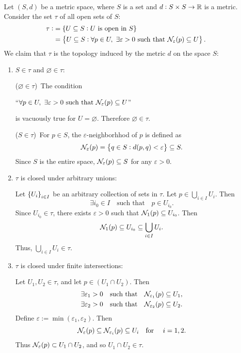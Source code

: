 \documentclass[11pt,openany]{article}
\begin{document}
\newpage
\begin{exercise*}
	Let $(S,d)$ be a metric space, where $S$ is a set and $d:S\times S\to\mathbb{R}$ is a metric. Consider the set $\tau$ of all open sets of $S$: \begin{align*}
	\tau:&=\set{U\subseteq S:U\ \text{is open in}\ S} \\
	&=\set{U\subseteq S:\forall p\in U,\ \exists\varepsilon>0\ \text{such that}\ \nbhd_\varepsilon(p)\subseteq U}.
	\end{align*} We claim that $\tau$ is the topology induced by the metric $d$ on the space $S$: \begin{enumerate}[(\text{O}1)]
	\item $S\in\tau$ and $\varnothing\in\tau$:
	
	($\varnothing\in\tau$)\ The condition \begin{center}
		``$\forall p\in U,\ \exists\varepsilon>0\ \text{such that}\ \nbhd_\varepsilon(p)\subseteq U$''
	\end{center} is vacuously true for $U=\varnothing$. Therefore $\varnothing\in\tau$.
	
	($S\in\tau$)\ For $p\in S$, the $\varepsilon$-neighborhhod of $p$ is defined as\[
	\mathcal{N}_\varepsilon(p)=\set{q\in S: d(p,q)<\varepsilon}\subseteq S.
	\] Since $S$ is the entire space, $\mathcal{N}_\varepsilon(p)\subseteq S$ for any 
	$\varepsilon>0$.
	\item $\tau$ is closed under arbitrary unions:
	
	Let $\set{U_i}_{i\in I}$ be an arbitrary collection of sets in $\tau$. Let $p\in\bigcup_{i\in I}U_i$. Then \[
	\exists i_0\in I\quad\text{such that}\quad p\in U_{i_0}.
	\] Since $U_{i_0}\in\tau$, there exists $\varepsilon>0$ such that $\mathcal{N}_1(p)\subseteq U_{i_0}$. Then \[
	\mathcal{N}_1(p)\subseteq U_{i_0}\subseteq\bigcup_{i\in I}U_i.
	\] Thus, $\bigcup_{i\in I}U_i\in\tau$.
	\item $\tau$ is closed under finite intersections:
	
	Let $U_1,U_2\in\tau$, and let $p\in (U_1\cap U_2)$. Then \begin{align*}
		\exists\varepsilon_1>0\quad\text{such that}\quad \mathcal{N}_{\varepsilon_1}(p)\subseteq U_1,\\
		\exists\varepsilon_2>0\quad\text{such that}\quad \mathcal{N}_{\varepsilon_2}(p)\subseteq U_2.
	\end{align*} Define $\varepsilon:=\min(\varepsilon_1,\varepsilon_2)$. Then \[
		\mathcal{N}_\varepsilon(p)\subseteq\mathcal{N}_{\varepsilon_i}(p)\subseteq U_i\quad\text{for }\quad i=1,2.
	\] Thus $\mathcal{N}_{\varepsilon}(p)\subset U_1\cap U_2$, and so $U_1\cap U_2\in\tau$.
\end{enumerate}
\end{exercise*}
\end{document}
